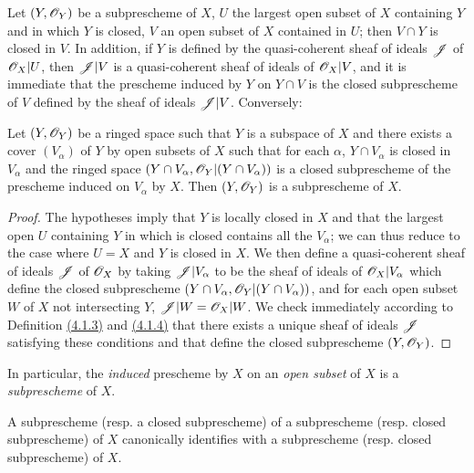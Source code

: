 \begin{env}[4.1.4]
\label{env-1.4.1.4}
Let $(Y,\mathscr{O}_Y)$ be a subprescheme of $X$, $U$ the largest open subset of $X$ containing $Y$
and in which $Y$ is closed, $V$ an open subset of $X$ contained in $U$; then $V\cap Y$ is
closed in $V$. In addition, if $Y$ is defined by the quasi-coherent sheaf of ideals $\mathscr{J}$
of $\mathscr{O}_X|U$, then $\mathscr{J}|V$ is a quasi-coherent sheaf of ideals of $\mathscr{O}_X|V$, and it is
immediate that the prescheme induced by $Y$ on $Y\cap V$ is the closed subprescheme of $V$
defined by the sheaf of ideals $\mathscr{J}|V$. Conversely:
\end{env}

\begin{prop}[4.1.5]
\label{prop-1.4.1.5}
Let $(Y,\mathscr{O}_Y)$ be a ringed space such that $Y$ is a subspace of $X$ and there exists a
cover $(V_\alpha)$ of $Y$ by open subsets of $X$ such that for each $\alpha$,
$Y\cap V_\alpha$ is closed in $V_\alpha$ and the ringed space
$(Y\cap V_\alpha,\mathscr{O}_Y|(Y\cap V_\alpha))$ is a closed subprescheme of the prescheme induced
on $V_\alpha$ by $X$. Then $(Y,\mathscr{O}_Y)$ is a subprescheme of $X$.
\end{prop}

\begin{proof}
\label{proof-prop-1.4.1.5}
The hypotheses imply that $Y$ is locally closed in $X$ and that the largest open $U$
containing $Y$ in which is closed contains all the $V_\alpha$; we can thus reduce to the case
where $U=X$ and $Y$ is closed in $X$. We then define a quasi-coherent sheaf of ideals
$\mathscr{J}$ of $\mathscr{O}_X$ by taking $\mathscr{J}|V_\alpha$ to be the sheaf of ideals of $\mathscr{O}_X|V_\alpha$
which define the closed subprescheme $(Y\cap V_\alpha,\mathscr{O}_Y|(Y\cap V_\alpha))$, and for each
open subset $W$ of $X$ not intersecting $Y$, $\mathscr{J}|W=\mathscr{O}_X|W$. We check immediately
according to Definition \hyperref[defn-1.4.1.3]{(4.1.3)} and \hyperref[env-1.4.1.4]{(4.1.4)}
that there exists a unique sheaf of ideals $\mathscr{J}$ satisfying these conditions and that
define the closed subprescheme $(Y,\mathscr{O}_Y)$.
\end{proof}

In particular, the {\it induced} prescheme by $X$ on an {\it open subset} of $X$ is a
{\it subprescheme} of $X$.

\begin{prop}[4.1.6]
\label{prop-1.4.1.6}
A subprescheme (resp. a closed subprescheme) of a subprescheme
(resp. closed subprescheme) of $X$ canonically identifies with a subprescheme
(resp. closed subprescheme) of $X$.
\end{prop}

